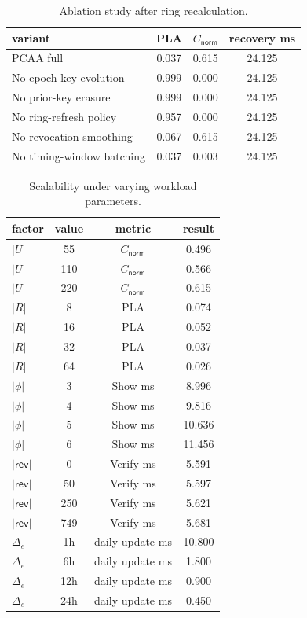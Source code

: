 \begin{table}[t]
\centering
\caption{Ablation study after ring recalculation.}
\label{tab:ablation}
\begin{tabular}{@{}lccc@{}}
\toprule
variant & PLA & $C_{\mathsf{norm}}$ & recovery ms \\
\midrule
PCAA full & 0.037 & 0.615 & 24.125 \\
No epoch key evolution & 0.999 & 0.000 & 24.125 \\
No prior-key erasure & 0.999 & 0.000 & 24.125 \\
No ring-refresh policy & 0.957 & 0.000 & 24.125 \\
No revocation smoothing & 0.067 & 0.615 & 24.125 \\
No timing-window batching & 0.037 & 0.003 & 24.125 \\
\bottomrule
\end{tabular}
\end{table}

\begin{table}[t]
\centering
\caption{Scalability under varying workload parameters.}
\label{tab:scalability}
\begin{tabular}{@{}lccc@{}}
\toprule
factor & value & metric & result \\
\midrule
$|U|$ & 55 & $C_{\mathsf{norm}}$ & 0.496 \\
$|U|$ & 110 & $C_{\mathsf{norm}}$ & 0.566 \\
$|U|$ & 220 & $C_{\mathsf{norm}}$ & 0.615 \\
$|R|$ & 8 & PLA & 0.074 \\
$|R|$ & 16 & PLA & 0.052 \\
$|R|$ & 32 & PLA & 0.037 \\
$|R|$ & 64 & PLA & 0.026 \\
$|\phi|$ & 3 & Show ms & 8.996 \\
$|\phi|$ & 4 & Show ms & 9.816 \\
$|\phi|$ & 5 & Show ms & 10.636 \\
$|\phi|$ & 6 & Show ms & 11.456 \\
$|\mathsf{rev}|$ & 0 & Verify ms & 5.591 \\
$|\mathsf{rev}|$ & 50 & Verify ms & 5.597 \\
$|\mathsf{rev}|$ & 250 & Verify ms & 5.621 \\
$|\mathsf{rev}|$ & 749 & Verify ms & 5.681 \\
$\Delta_e$ & 1h & daily update ms & 10.800 \\
$\Delta_e$ & 6h & daily update ms & 1.800 \\
$\Delta_e$ & 12h & daily update ms & 0.900 \\
$\Delta_e$ & 24h & daily update ms & 0.450 \\
\bottomrule
\end{tabular}
\end{table}
